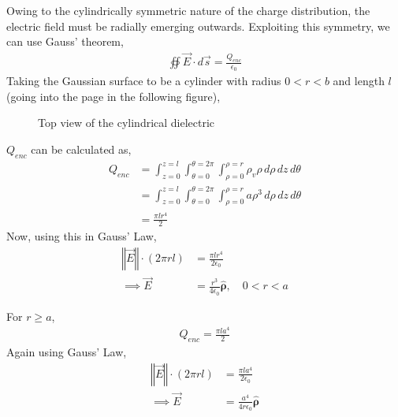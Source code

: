\begin{problem}{}{}

        Owing to the cylindrically symmetric nature of the charge distribution, the electric field must be radially emerging outwards. Exploiting this symmetry, we can use Gauss' theorem, 
        \begin{align*}
            \oiint \vec{E}\cdot d\vec{s} = \frac{Q_{enc}}{\epsilon_0}
        \end{align*}
        Taking the Gaussian surface to be a cylinder with radius $0<r<b$ and length $l$ (going into the page in the following figure), 
        \begin{figure}[!ht]
            \centering
            \caption{Top view of the cylindrical dielectric}
        \end{figure}
        $Q_{enc}$ can be calculated as,
        \begin{align*}
            Q_{enc} &= \int_{z=0}^{z=l}\int_{\theta = 0}^{\theta =2\pi}\int_{\rho=0}^{\rho=r}\rho_v \rho \,d\rho \,dz \, d\theta\\
            &= \int_{z=0}^{z=l}\int_{\theta = 0}^{\theta =2\pi}\int_{\rho=0}^{\rho=r}a \rho^3 \,d\rho \,dz \, d\theta\\
            &= \frac{\pi lr^4}{2}
        \end{align*}
        Now, using this in Gauss' Law,
        \begin{align*}
            \left\Vert \vec{E} \right\Vert \cdot{\left(2\pi rl\right)} &= \frac{\pi lr^4}{2\epsilon_0}\\
            \implies \vec{E} &= \frac{r^3}{4\epsilon_0}\boldsymbol{\hat{\rho}},\quad 0< r < a
        \end{align*}

        For $r \ge a$, 
        \begin{align*}
            Q_{enc} = \frac{\pi la^4}{2}
        \end{align*}
        Again using Gauss' Law, 
        \begin{align*}
            \left\Vert \vec{E} \right\Vert \cdot{\left(2\pi rl\right)} &= \frac{\pi la^4}{2\epsilon_0}\\
            \implies \vec{E} &= \frac{a^4}{4r\epsilon_0}\boldsymbol{\hat{\rho}}
        \end{align*}        
\end{problem}

